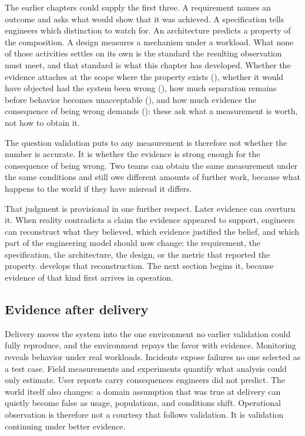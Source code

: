 The earlier chapters could supply the first three. A requirement names an outcome and asks what
would show that it was achieved. A specification tells engineers which distinction to watch for. An
architecture predicts a property of the composition. A design measures a mechanism under a workload.
What none of those activities settles on its own is the standard the resulting observation must
meet, and that standard is what this chapter has developed. Whether the evidence attaches at the
scope where the property exists (\citet{sec-scope-of-property}), whether it would have objected had the
system been wrong (\citet{tbl-evidence-strength}), how much separation remains before behavior becomes
unacceptable (\citet{sec-margin-containment}), and how much evidence the consequence of being wrong demands
(\citet{sec-consequence-evidence}): these ask what a measurement is worth, not how to obtain it.

The question validation puts to any measurement is therefore not whether the number is accurate. It
is whether the evidence is strong enough for the consequence of being wrong. Two teams can obtain
the same measurement under the same conditions and still owe different amounts of further work,
because what happens to the world if they have misread it differs.

That judgment is provisional in one further respect. Later evidence can overturn it. When reality
contradicts a claim the evidence appeared to support, engineers can reconstruct what they believed,
which evidence justified the belief, and which part of the engineering model should now change: the
requirement, the specification, the architecture, the design, or the metric that reported the
property. \citet{ch-failure-aware-engineering} develops that reconstruction. The next section begins it,
because evidence of that kind first arrives in operation.

\subsection{Evidence after delivery}\label{sec-after-delivery}

Delivery moves the system into the one environment no earlier validation could fully reproduce, and
the environment repays the favor with evidence. Monitoring reveals behavior under real workloads.
Incidents expose failures no one selected as a test case. Field measurements and experiments
quantify what analysis could only estimate. User reports carry consequences engineers did not
predict. The world itself also changes: a domain assumption that was true at delivery can quietly
become false as usage, populations, and conditions shift. Operational observation is therefore not
a courtesy that follows validation. It is validation continuing under better evidence.

